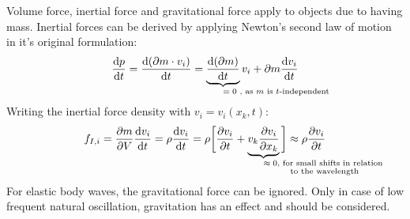 \documentclass[pdftex,a4paper,parskip,listof=totoc,bibliography=totoc,onehalfspacing,12pt]{scrreprt}
\begin{document}
Volume force, inertial force and gravitational force apply to objects due to having mass. 
Inertial forces can be derived by applying Newton's  second law of motion in it's original formulation: 
\begin{equation}
	\frac{\mathrm{d} p}{\mathrm{d} t} = \frac{\mathrm{d} (\partial m \cdot v_i)}{\mathrm{d} t} = \underbrace{\frac{\mathrm{d} (\partial m)}{\mathrm{d} t}}_{\mathrlap{\text{$= 0$ , as $m$ is $t$-independent}}} v_i + \partial m \frac{\mathrm{d} v_i}{\mathrm{d} t}
\end{equation}
Writing the inertial force density with $v_i = v_i (x_k,t)$:
\begin{equation}
	f_{I,i} = \frac{\partial m}{\partial V} \frac{\mathrm{d} v_i}{\mathrm{d} t} = \rho \frac{\mathrm{d} v_i}{\mathrm{d} t} = \rho \bigg[ \frac{\partial v_i}{\partial t} + \underbrace{v_k \frac{\partial v_i}{\partial x_k}}_{\mathrlap{\substack{\text{$\approx 0$, for small shifts in relation}\\\text{ to the wavelength}}}} \bigg] \approx \rho \frac{\partial v_i}{\partial t}\label{eqn:TKD}
\end{equation}
For elastic body waves, the gravitational force can be ignored. Only in case of low frequent natural oscillation, gravitation has an effect and should be considered.
\end{document}

